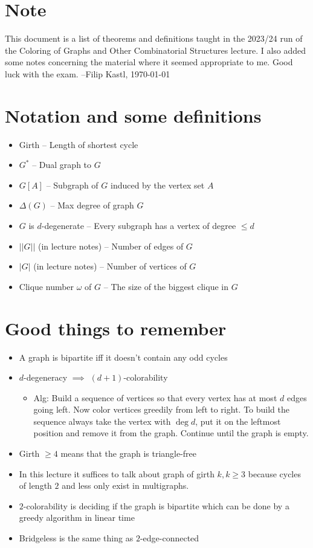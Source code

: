 \documentclass{article}
\begin{document}
\section*{Note}
This document is a list of theorems and definitions taught in the 2023/24 run
of the Coloring of Graphs and Other Combinatorial Structures lecture. I also
added some notes concerning the material where it seemed appropriate to me.
Good luck with the exam. --Filip Kastl, \today

\tableofcontents

\newpage
\section*{Notation and some definitions}
\begin{itemize}
	\item Girth -- Length of shortest cycle
	\item $G^*$ -- Dual graph to $G$
	\item $G[A]$ -- Subgraph of $G$ induced by the vertex set $A$
	\item $\Delta(G)$ -- Max degree of graph $G$
	\item $G$ is $d$-degenerate -- Every subgraph has a vertex of degree
		$\le d$
	\item $||G||$ (in lecture notes) -- Number of edges of $G$
	\item $|G|$ (in lecture notes) -- Number of vertices of $G$
	\item Clique number $\omega$ of $G$ -- The size of the biggest clique
		in $G$
\end{itemize}

\section*{Good things to remember}
\begin{itemize}
	\item A graph is bipartite iff it doesn't contain any odd cycles
	\item $d$-degeneracy $\implies$ $(d+1)$-colorability
		\begin{itemize}
			\item
				Alg: Build a sequence of vertices so that every
				vertex has at most $d$ edges going left. Now
				color vertices greedily from left to right. To
				build the sequence always take the vertex with
				$\deg d$, put it on the leftmost position and
				remove it from the graph. Continue until the
				graph is empty.
		\end{itemize}
	\item Girth $\ge 4$ means that the graph is triangle-free
	\item In this lecture it suffices to talk about graph of girth $k, k
		\ge 3$ because cycles of length $2$ and less only exist in
		multigraphs.
	\item $2$-colorability is deciding if the graph is bipartite which can
		be done by a greedy algorithm in linear time
	\item Bridgeless is the same thing as $2$-edge-connected
\end{itemize}
\end{document}
